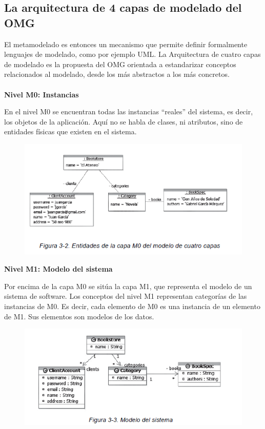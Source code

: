 \subsection{La arquitectura de 4 capas de modelado del OMG}

El metamodelado es entonces un mecanismo que permite definir formalmente
	lenguajes de modelado, como por ejemplo UML. La Arquitectura
	de cuatro capas de modelado es la propuesta del OMG orientada a
	estandarizar conceptos relacionados al modelado, desde los más abstractos
	a los más concretos.
\\
\\
\textbf{Nivel M0: Instancias}

En el nivel M0 se encuentran todas las instancias “reales” del sistema,
es decir, los objetos de la aplicación. Aquí no se habla de clases, ni
atributos, sino de entidades físicas que existen en el sistema.

\begin{figure}[H]
\centering
\includegraphics[scale=0.9]{./Imagenes/modelo9}
\end{figure}


\textbf{Nivel M1: Modelo del sistema}

Por encima de la capa M0 se sitúa la capa M1, que representa el modelo
de un sistema de software. Los conceptos del nivel M1 representan categorías
de las instancias de M0. Es decir, cada elemento de M0 es una
instancia de un elemento de M1. Sus elementos son modelos de los datos.

\begin{figure}[H]
\centering
\includegraphics[scale=0.9]{./Imagenes/modelo10}
\end{figure}


